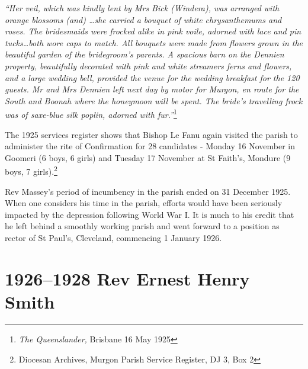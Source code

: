 \emph{``Her veil, which was kindly lent by Mrs Bick (Windera), was arranged with orange blossoms (and) \ldots she carried a bouquet of white chrysanthemums and roses. The bridesmaids were frocked alike in pink voile, adorned with lace and pin tucks\ldots both wore caps to match. All bouquets were made from flowers grown in the beautiful garden of the bridegroom's parents. A spacious barn on the Dennien property, beautifully decorated with pink and white streamers ferns and flowers, and a large wedding bell, provided the venue for the wedding breakfast for the 120 guests. Mr and Mrs Dennien left next day by motor for Murgon, en route for the South and Boonah where the honeymoon will be spent. The bride's travelling frock was of saxe-blue silk poplin, adorned with fur.''}\footnote{\emph{The Queenslander,} Brisbane 16 May 1925}


\smallskip


The 1925 services register shows that Bishop Le Fanu again visited the parish to administer the rite of Confirmation for 28 candidates - Monday 16 November in Goomeri (6 boys, 6 girls) and Tuesday 17 November at St Faith's, Mondure (9 boys, 7 girls).\footnote{Diocesan Archives, Murgon Parish Service Register, DJ 3, Box 2}


\balance


Rev Massey's period of incumbency in the parish ended on 31 December 1925. When one considers his time in the parish, efforts would have been seriously impacted by the depression following World War I. It is much to his credit that he left behind a smoothly working parish and went forward to a position as rector of St Paul's, Cleveland, commencing 1 January 1926.



\printendnotes[custom]
\setcounter{endnote}{0}




\chapter{1926--1928 Rev Ernest Henry Smith}
\nobalance








